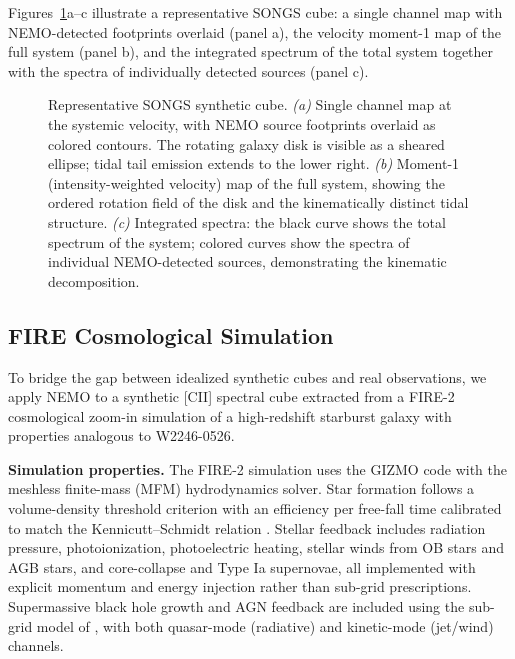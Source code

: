 \documentclass{aa}
\begin{document}
Figures~\ref{fig:songs_example}a--c illustrate a representative SONGS cube: a single channel map with NEMO-detected footprints overlaid (panel a), the velocity moment-1 map of the full system (panel b), and the integrated spectrum of the total system together with the spectra of individually detected sources (panel c).

\begin{figure}
  \centering
  \caption{Representative SONGS synthetic cube. \textit{(a)} Single channel map at the systemic velocity, with NEMO source footprints overlaid as colored contours. The rotating galaxy disk is visible as a sheared ellipse; tidal tail emission extends to the lower right. \textit{(b)} Moment-1 (intensity-weighted velocity) map of the full system, showing the ordered rotation field of the disk and the kinematically distinct tidal structure. \textit{(c)} Integrated spectra: the black curve shows the total spectrum of the system; colored curves show the spectra of individual NEMO-detected sources, demonstrating the kinematic decomposition.}
  \label{fig:songs_example}
\end{figure}

\subsection{FIRE Cosmological Simulation}
\label{sec:data_fire}

To bridge the gap between idealized synthetic cubes and real observations, we apply NEMO to a synthetic [CII] spectral cube extracted from a FIRE-2 \citep{Hopkins+2018} cosmological zoom-in simulation of a high-redshift starburst galaxy with properties analogous to W2246-0526.

\textbf{Simulation properties.} The FIRE-2 simulation uses the GIZMO code \citep{Hopkins+2015} with the meshless finite-mass (MFM) hydrodynamics solver. Star formation follows a volume-density threshold criterion with an efficiency per free-fall time calibrated to match the Kennicutt--Schmidt relation \citep{...}. Stellar feedback includes radiation pressure, photoionization, photoelectric heating, stellar winds from OB stars and AGB stars, and core-collapse and Type Ia supernovae, all implemented with explicit momentum and energy injection rather than sub-grid prescriptions. Supermassive black hole growth and AGN feedback are included using the sub-grid model of \citet{...}, with both quasar-mode (radiative) and kinetic-mode (jet/wind) channels.
\end{document}

